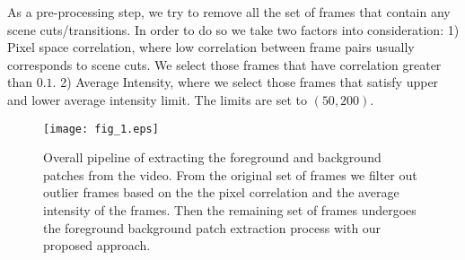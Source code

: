 \documentclass[10pt,twocolumn,letterpaper]{article}
\begin{document}
As a pre-processing step, we try to remove all the set of frames that contain any scene cuts/transitions. In order to do so we take two factors into consideration: 1) Pixel space correlation, where low correlation between frame pairs usually corresponds to scene cuts. We select those frames that have correlation greater than $0.1$. 2) Average Intensity, where we select those frames that satisfy upper and lower average intensity limit. The limits are set to $(50,200)$.

\begin{figure*}[!t]
\centering
\texttt{[image: fig\_1.eps]}
\caption{Overall pipeline of extracting the foreground and background patches from the video. From the original set of frames we filter out outlier frames based on the the pixel correlation and the average intensity of the frames. Then the remaining set of frames undergoes the foreground background patch extraction process with our proposed approach.}
\label{fig: overall pipeline}
\end{figure*}
\end{document}
